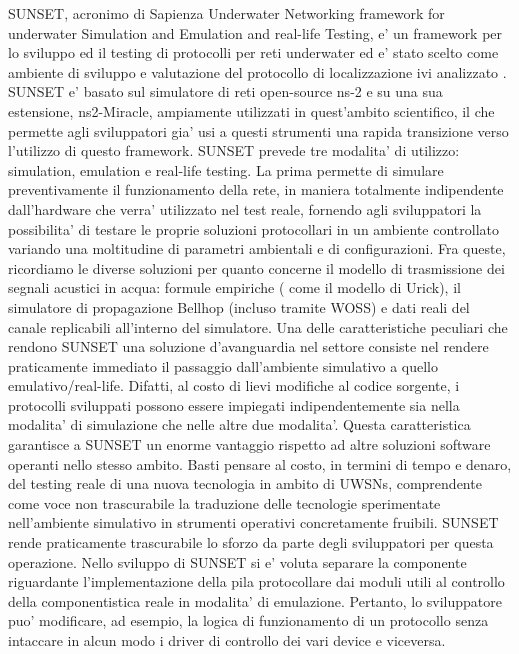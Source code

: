 SUNSET, acronimo di Sapienza Underwater Networking framework for underwater Simulation and Emulation and real-life Testing, e' un framework per lo sviluppo ed il testing di protocolli per reti underwater ed e' stato scelto come ambiente di sviluppo e valutazione del protocollo di localizzazione ivi analizzato \cite{sunset}.\newline
SUNSET e' basato sul simulatore di reti open-source ns-2 e su una sua estensione, ns2-Miracle, ampiamente utilizzati in quest'ambito scientifico, il che permette agli sviluppatori gia' usi a questi strumenti una rapida transizione verso l'utilizzo di questo framework.
SUNSET prevede tre modalita' di utilizzo: simulation, emulation e real-life testing.
La prima permette di simulare preventivamente il funzionamento della rete, in maniera totalmente indipendente dall'hardware che verra' utilizzato nel test reale, fornendo agli sviluppatori la possibilita' di testare le proprie soluzioni protocollari in un ambiente controllato variando una moltitudine di parametri ambientali e di configurazioni. Fra queste, ricordiamo le diverse soluzioni per quanto concerne il modello di trasmissione dei segnali acustici in acqua: formule empiriche ( come il modello di Urick), il simulatore di propagazione Bellhop (incluso tramite WOSS) e dati reali del canale replicabili all'interno del simulatore.
\newline
Una delle caratteristiche peculiari che rendono SUNSET una soluzione d'avanguardia nel settore consiste nel rendere praticamente immediato il passaggio dall'ambiente simulativo a quello emulativo/real-life. Difatti, al costo di lievi modifiche al codice sorgente, i protocolli sviluppati possono essere impiegati indipendentemente sia nella modalita' di simulazione che nelle altre due modalita'. Questa caratteristica garantisce a SUNSET un enorme vantaggio rispetto ad altre soluzioni software operanti nello stesso ambito. Basti pensare al costo, in termini di tempo e denaro, del testing reale di una nuova tecnologia in ambito di UWSNs, comprendente come voce non trascurabile la traduzione delle tecnologie sperimentate nell'ambiente simulativo in strumenti operativi concretamente fruibili. SUNSET rende praticamente trascurabile lo sforzo da parte degli sviluppatori per questa operazione.
\newline
Nello sviluppo di SUNSET si e' voluta separare la componente riguardante l'implementazione della pila protocollare dai moduli utili al controllo della componentistica reale in modalita' di emulazione. Pertanto, lo sviluppatore puo' modificare, ad esempio, la logica di funzionamento di un protocollo senza intaccare in alcun modo i driver di controllo dei vari device e viceversa.
